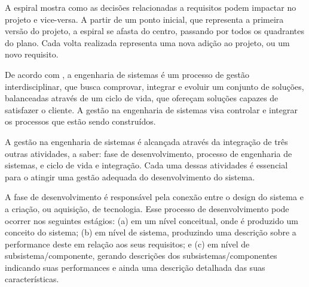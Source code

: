     \begin{figure}[h!]
        \centering
    \end{figure}
     
    A espiral mostra como as decisões relacionadas a requisitos podem impactar no projeto e vice-versa. A partir de um ponto inicial, que representa a primeira versão do projeto, a espiral se afasta do centro, passando por todos os quadrantes do plano. Cada volta realizada representa uma nova adição ao projeto, ou um novo requisito.  
    
    De acordo com , a engenharia de sistemas é um processo de gestão interdisciplinar, que busca comprovar, integrar e evoluir um conjunto de soluções, balanceadas através de um ciclo de vida, que ofereçam soluções capazes de satisfazer o cliente. A gestão na engenharia de sistemas visa controlar e integrar os processos que estão sendo construídos. 
    
        
    A gestão na engenharia de sistemas é alcançada através da integração de três outras atividades, a saber: fase de desenvolvimento, processo de engenharia de sistemas, e ciclo de vida e integração. Cada uma dessas atividades é essencial para o atingir uma gestão adequada do desenvolvimento do sistema.
    
    A fase de desenvolvimento é responsável pela conexão entre o design do sistema e a criação, ou aquisição, de tecnologia. Esse processo de desenvolvimento pode ocorrer nos seguintes estágios: (a) em um nível conceitual, onde é produzido um conceito do sistema; (b) em nível de sistema, produzindo uma descrição sobre a performance deste em relação aos seus requisitos; e (c) em nível de subsistema/componente, gerando descrições dos subsistemas/componentes indicando suas performances e ainda uma descrição detalhada das suas características.
    
